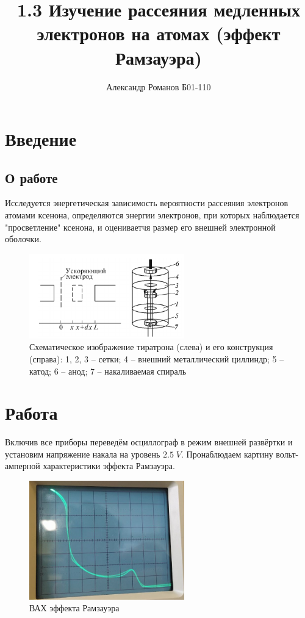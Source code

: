 \documentclass{article}
\author{Александр Романов Б01-110}
\date{}
\title{1.3 Изучение рассеяния медленных электронов на атомах (эффект Рамзауэра)}
\begin{document}
\maketitle
\section{Введение}
\subsection{О работе}
Исследуется энергетическая зависимость вероятности рассеяния электронов атомами ксенона, определяются
энергии электронов, при которых наблюдается "просветление" ксенона, и оцениваетчя размер его внешней
электронной оболочки.

\begin{figure}[H]
	\centering
	\includegraphics[width=0.6\textwidth]{scheme.png}
	\caption{Схематическое изображение тиратрона (слева) и его конструкция (справа): 
	1, 2, 3 -- сетки; 4 -- внешний металлический циллиндр; 5 -- катод; 6 -- анод;
	7 -- накаливаемая спираль}
\end{figure}

\section{Работа}
Включив все приборы переведём осциллограф в режим внешней развёртки и установим
напряжение накала на уровень \(2.5\;V\). Пронаблюдаем картину вольт-амперной
характеристики эффекта Рамзауэра.

\begin{figure}[H]
	\centering
	\includegraphics[width=0.6\textwidth]{signal.jpeg}
	\caption{ВАХ эффекта Рамзауэра}
\end{figure}
\end{document}
